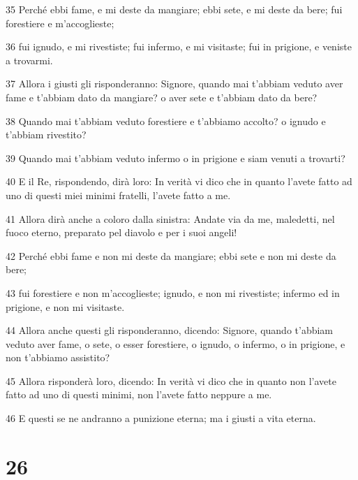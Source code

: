 \par 35 Perché ebbi fame, e mi deste da mangiare; ebbi sete, e mi deste da bere; fui forestiere e m'accoglieste;
\par 36 fui ignudo, e mi rivestiste; fui infermo, e mi visitaste; fui in prigione, e veniste a trovarmi.
\par 37 Allora i giusti gli risponderanno: Signore, quando mai t'abbiam veduto aver fame e t'abbiam dato da mangiare? o aver sete e t'abbiam dato da bere?
\par 38 Quando mai t'abbiam veduto forestiere e t'abbiamo accolto? o ignudo e t'abbiam rivestito?
\par 39 Quando mai t'abbiam veduto infermo o in prigione e siam venuti a trovarti?
\par 40 E il Re, rispondendo, dirà loro: In verità vi dico che in quanto l'avete fatto ad uno di questi miei minimi fratelli, l'avete fatto a me.
\par 41 Allora dirà anche a coloro dalla sinistra: Andate via da me, maledetti, nel fuoco eterno, preparato pel diavolo e per i suoi angeli!
\par 42 Perché ebbi fame e non mi deste da mangiare; ebbi sete e non mi deste da bere;
\par 43 fui forestiere e non m'accoglieste; ignudo, e non mi rivestiste; infermo ed in prigione, e non mi visitaste.
\par 44 Allora anche questi gli risponderanno, dicendo: Signore, quando t'abbiam veduto aver fame, o sete, o esser forestiere, o ignudo, o infermo, o in prigione, e non t'abbiamo assistito?
\par 45 Allora risponderà loro, dicendo: In verità vi dico che in quanto non l'avete fatto ad uno di questi minimi, non l'avete fatto neppure a me.
\par 46 E questi se ne andranno a punizione eterna; ma i giusti a vita eterna.

\chapter{26}

